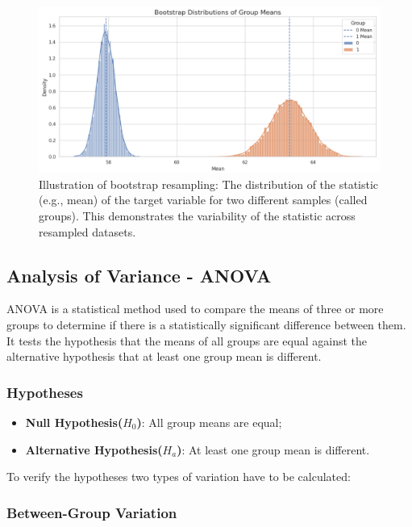 \begin{center}
\begin{figure}[H]
  \centering
  \includegraphics[width=5in]{img/bootstrap.jpg}
  \caption{Illustration of bootstrap resampling: The distribution of the
  statistic (e.g., mean) of the target variable for two different samples
(called groups). This demonstrates the variability of the statistic across
resampled datasets.}
  \label{Figure:fig_beh}
\end{figure}
\end{center}

\subsection{Analysis of Variance - ANOVA}
ANOVA is a statistical method used to compare the means of three or more groups
to determine if there is a statistically significant difference between them.
It tests the hypothesis that the means of all groups are equal against the
alternative hypothesis that at least one group mean is different.

\subsubsection*{Hypotheses}
\begin{itemize}
  \item \textbf{Null Hypothesis($H_0$)}: All group means are equal;
  \item \textbf{Alternative Hypothesis($H_a$)}: At least one group mean is
    different.
\end{itemize}

\noindent \noindent To verify the hypotheses two types of variation have to
be calculated:

\subsubsection*{Between-Group Variation}

